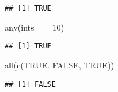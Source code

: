 \documentclass[
]{book}
\newenvironment{Shaded}{\begin{snugshade}}{\end{snugshade}}
\newcommand{\ConstantTok}[1]{\textcolor[rgb]{0.00,0.00,0.00}{#1}}
\newcommand{\DecValTok}[1]{\textcolor[rgb]{0.00,0.00,0.81}{#1}}
\newcommand{\FunctionTok}[1]{\textcolor[rgb]{0.00,0.00,0.00}{#1}}
\newcommand{\NormalTok}[1]{#1}
\newcommand{\SpecialCharTok}[1]{\textcolor[rgb]{0.00,0.00,0.00}{#1}}
\begin{document}
\begin{verbatim}
## [1] TRUE
\end{verbatim}

\begin{Shaded}
\begin{Highlighting}[]
\FunctionTok{any}\NormalTok{(ints }\SpecialCharTok{==} \DecValTok{10}\NormalTok{)}
\end{Highlighting}
\end{Shaded}

\begin{verbatim}
## [1] TRUE
\end{verbatim}

\begin{Shaded}
\begin{Highlighting}[]
\FunctionTok{all}\NormalTok{(}\FunctionTok{c}\NormalTok{(}\ConstantTok{TRUE}\NormalTok{, }\ConstantTok{FALSE}\NormalTok{, }\ConstantTok{TRUE}\NormalTok{))}
\end{Highlighting}
\end{Shaded}

\begin{verbatim}
## [1] FALSE
\end{verbatim}

  
\end{document}
